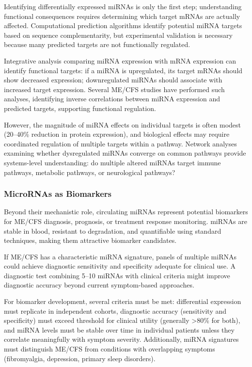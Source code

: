 Identifying differentially expressed miRNAs is only the first step; understanding functional consequences requires determining which target mRNAs are actually affected. Computational prediction algorithms identify potential miRNA targets based on sequence complementarity, but experimental validation is necessary because many predicted targets are not functionally regulated.

Integrative analysis comparing miRNA expression with mRNA expression can identify functional targets: if a miRNA is upregulated, its target mRNAs should show decreased expression; downregulated miRNAs should associate with increased target expression. Several ME/CFS studies have performed such analyses, identifying inverse correlations between miRNA expression and predicted targets, supporting functional regulation.

However, the magnitude of miRNA effects on individual targets is often modest (20--40\% reduction in protein expression), and biological effects may require coordinated regulation of multiple targets within a pathway. Network analyses examining whether dysregulated miRNAs converge on common pathways provide systems-level understanding: do multiple altered miRNAs target immune pathways, metabolic pathways, or neurological pathways?

\subsubsection{MicroRNAs as Biomarkers}

Beyond their mechanistic role, circulating miRNAs represent potential biomarkers for ME/CFS diagnosis, prognosis, or treatment response monitoring. miRNAs are stable in blood, resistant to degradation, and quantifiable using standard techniques, making them attractive biomarker candidates.

\begin{prediction}
If ME/CFS has a characteristic miRNA signature, panels of multiple miRNAs could achieve diagnostic sensitivity and specificity adequate for clinical use. A diagnostic test combining 5--10 miRNAs with clinical criteria might improve diagnostic accuracy beyond current symptom-based approaches.

For biomarker development, several criteria must be met: differential expression must replicate in independent cohorts, diagnostic accuracy (sensitivity and specificity) must exceed threshold for clinical utility (generally >80\% for both), and miRNA levels must be stable over time in individual patients unless they correlate meaningfully with symptom severity. Additionally, miRNA signatures must distinguish ME/CFS from conditions with overlapping symptoms (fibromyalgia, depression, primary sleep disorders).
\end{prediction}

